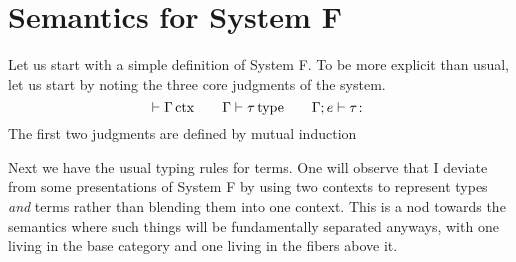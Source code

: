 \section{Semantics for System F}

Let us start with a simple definition of System F. To be more explicit
than usual, let us start by noting the three core judgments of the
system.
\[
  \vdash \Gamma\,\mathrm{ctx} \qquad \Gamma \vdash \tau\,\mathrm{type} \qquad \Gamma; e \vdash \tau \colon \]
The first two judgments are defined by mutual induction

Next we have the usual typing rules for terms. One will observe that I
deviate from some presentations of System F by using two contexts to
represent types \emph{and} terms rather than blending them into one
context. This is a nod towards the semantics where such things will be
fundamentally separated anyways, with one living in the base category
and one living in the fibers above it.


